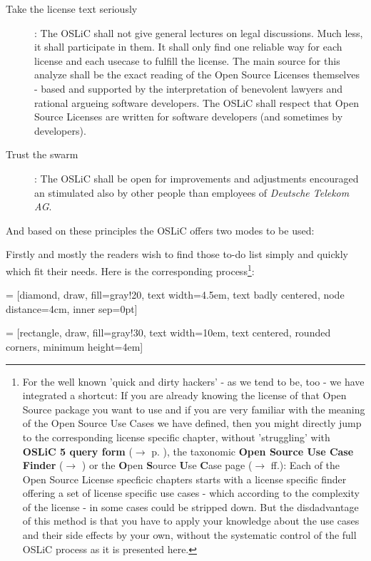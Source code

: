 \begin{description}
  \item[Take the license text seriously]: The OSLiC shall not give general
  lectures on legal discussions. Much less, it shall participate in them. It
  shall only find one reliable way for each license and each usecase to fulfill
  the license. The main source for this analyze shall be the exact reading of
  the Open Source Licenses themselves - based and supported by the
  interpretation of benevolent lawyers and rational argueing software
  developers. The OSLiC shall respect that Open Source Licenses are written for
  software developers (and sometimes by developers).
  
  \item[Trust the swarm]: The OSLiC shall be open for improvements and
  adjustments encouraged an stimulated also by other people than employees of
  \emph{Deutsche Telekom AG}.
\end{description}

And based on these principles the OSLiC offers two modes to be used:

Firstly and mostly the readers wish to find those to-do list simply and quickly
which fit their needs. Here is the corresponding process\footnote{For the well
known 'quick and dirty hackers' - as we tend to be, too - we have integrated a
shortcut: If you are already knowing the license of that Open Source package you
want to use and if you are very familiar with the meaning of the Open Source Use
Cases we have defined, then you might directly jump to the corresponding license
specific chapter, without 'struggling' with \textbf{OSLiC 5 query form}
($\rightarrow$ p. \pageref{OSLiCStandardFormForGatheringInformation}), the
taxonomic \textbf{Open Source Use Case Finder} ($\rightarrow$
\pageref{OSLiCUseCaseFinder}) or the \textbf{O}pen \textbf{S}ource \textbf{U}se
\textbf{C}ase page ($\rightarrow$ \pageref{OSUCList}ff.): Each of the Open
Source License specficic chapters starts with a license specific finder offering
a set of license specific use cases - which according to the complexity of the
license - in some cases could be stripped down. But the disdadvantage of this
method is that you have to apply your knowledge about the use cases and their
side effects by your own, without the systematic control of the full OSLiC
process as it is presented here.
}:

 = [diamond, draw, fill=gray!20, 
    text width=4.5em, text badly centered, node distance=4cm, inner sep=0pt]

 = [rectangle, draw, fill=gray!30, 
    text width=10em, text centered, rounded corners, minimum height=4em]
 
